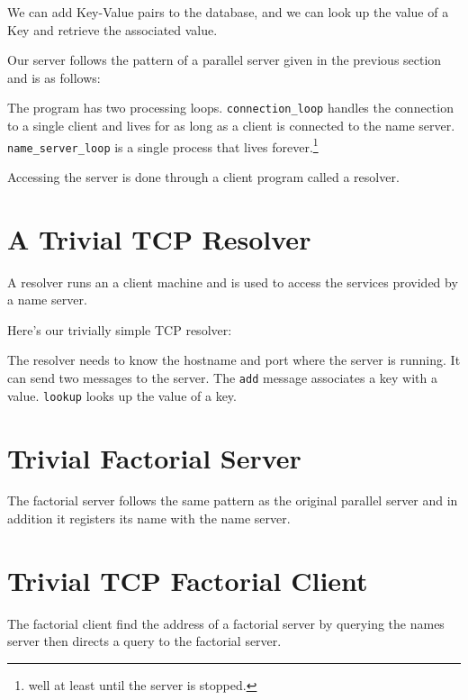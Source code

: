 \documentclass[12pt]{article}
\begin{document}
We can add Key-Value pairs to the database, and we can look up the
value of a Key and retrieve the associated value.

Our server follows the pattern of a parallel server given in the previous section
and is as follows:


The program has two processing loops. \verb+connection_loop+ handles
the connection to a single client and lives for as long as a client is
connected to the name server.  \verb+name_server_loop+ is a single
process that lives forever.\footnote{well at least until the server is
  stopped.}

Accessing the server is done through a client program called a resolver.

\section{A Trivial TCP Resolver}

A resolver runs an a client machine and is used to access the services
provided by a name server.

Here's our trivially simple TCP resolver:



The resolver needs to know the hostname and port where the server is running.
It can send two messages to the server. 
The \verb+add+ message associates a key with a value. 
\verb+lookup+ looks up the value of a key.

\section{Trivial Factorial Server}

The factorial server follows the same pattern as the original parallel server
and in addition it registers its name with the name server.


\section{Trivial TCP Factorial Client}

The factorial client find the address of a factorial server by querying the 
names server then directs a query to the factorial server.

\end{document}
